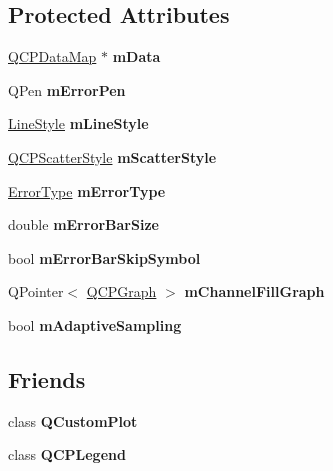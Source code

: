 \subsection*{Protected Attributes}
\begin{DoxyCompactItemize}
\item 
\hypertarget{class_q_c_p_graph_a8457c840f69a0ac49f61d30a509c5d08}{}\label{class_q_c_p_graph_a8457c840f69a0ac49f61d30a509c5d08} 
\hyperlink{qcustomplot_8h_a84a9c4a4c2216ccfdcb5f3067cda76e3}{Q\+C\+P\+Data\+Map} $\ast$ {\bfseries m\+Data}
\item 
\hypertarget{class_q_c_p_graph_aa35681a24165c2831301091a87b662ce}{}\label{class_q_c_p_graph_aa35681a24165c2831301091a87b662ce} 
Q\+Pen {\bfseries m\+Error\+Pen}
\item 
\hypertarget{class_q_c_p_graph_a8604fd98402035a63375849f7341ee25}{}\label{class_q_c_p_graph_a8604fd98402035a63375849f7341ee25} 
\hyperlink{class_q_c_p_graph_ad60175cd9b5cac937c5ee685c32c0859}{Line\+Style} {\bfseries m\+Line\+Style}
\item 
\hypertarget{class_q_c_p_graph_a4aa36241f166ccd1f75fc8f24e4a3247}{}\label{class_q_c_p_graph_a4aa36241f166ccd1f75fc8f24e4a3247} 
\hyperlink{class_q_c_p_scatter_style}{Q\+C\+P\+Scatter\+Style} {\bfseries m\+Scatter\+Style}
\item 
\hypertarget{class_q_c_p_graph_a29e64273db201aeadebc61c870720a36}{}\label{class_q_c_p_graph_a29e64273db201aeadebc61c870720a36} 
\hyperlink{class_q_c_p_graph_ad23b514404bd2cb3216f57c90904d6af}{Error\+Type} {\bfseries m\+Error\+Type}
\item 
\hypertarget{class_q_c_p_graph_a7b51c8d09510f9d195b5e765ccbcf05b}{}\label{class_q_c_p_graph_a7b51c8d09510f9d195b5e765ccbcf05b} 
double {\bfseries m\+Error\+Bar\+Size}
\item 
\hypertarget{class_q_c_p_graph_acf631d7dbd1055a69ab3b63094868557}{}\label{class_q_c_p_graph_acf631d7dbd1055a69ab3b63094868557} 
bool {\bfseries m\+Error\+Bar\+Skip\+Symbol}
\item 
\hypertarget{class_q_c_p_graph_a2f1777c7accf8244fc640c33f0b04577}{}\label{class_q_c_p_graph_a2f1777c7accf8244fc640c33f0b04577} 
Q\+Pointer$<$ \hyperlink{class_q_c_p_graph}{Q\+C\+P\+Graph} $>$ {\bfseries m\+Channel\+Fill\+Graph}
\item 
\hypertarget{class_q_c_p_graph_aa951e78aeba714cf443be6da2e52502e}{}\label{class_q_c_p_graph_aa951e78aeba714cf443be6da2e52502e} 
bool {\bfseries m\+Adaptive\+Sampling}
\end{DoxyCompactItemize}
\subsection*{Friends}
\begin{DoxyCompactItemize}
\item 
\hypertarget{class_q_c_p_graph_a1cdf9df76adcfae45261690aa0ca2198}{}\label{class_q_c_p_graph_a1cdf9df76adcfae45261690aa0ca2198} 
class {\bfseries Q\+Custom\+Plot}
\item 
\hypertarget{class_q_c_p_graph_a8429035e7adfbd7f05805a6530ad5e3b}{}\label{class_q_c_p_graph_a8429035e7adfbd7f05805a6530ad5e3b} 
class {\bfseries Q\+C\+P\+Legend}
\end{DoxyCompactItemize}
